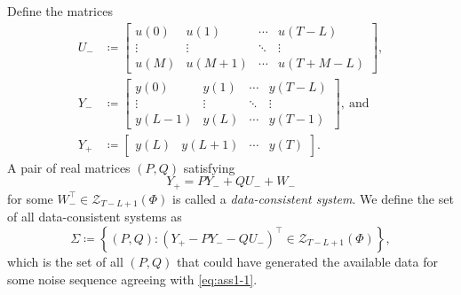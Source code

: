 \documentclass[pdflatex,sn-mathphys-num]{sn-jnl}%
\theoremstyle{thmstyleone}
\begin{document}
Define the matrices
\begin{equation*}
\begin{split}
U_-&\coloneqq \begin{bmatrix}
u(0) & u(1) & \cdots & u(T-L) \\ 
\vdots & \vdots & \ddots & \vdots \\
u(M) & u(M+1) & \cdots & u(T+M-L)
\end{bmatrix}, \\
Y_-&\coloneqq \begin{bmatrix}
y(0) & y(1) & \cdots & y(T-L) \\
\vdots & \vdots & \ddots & \vdots \\
y(L-1) & y(L) & \cdots & y(T-1)
\end{bmatrix},\ \text{and} \\
Y_+&\coloneqq \begin{bmatrix}
y(L) & y(L+1) & \cdots & y(T)\end{bmatrix}.
\end{split}
\end{equation*}
A pair of real matrices $(P,Q)$ satisfying
\begin{equation}
\label{eq:7}
Y_+=PY_-+QU_-+W_-
\end{equation}
for some $W_-^\top\in \mathcal{Z}_{T-L+1}(\Phi)$ is called a \emph{data-consistent system}. We define the set of all data-consistent systems as
\begin{equation}
\label{eq:8}
\Sigma\coloneqq \left\{(P,Q):(Y_+-PY_--QU_-)^\top\in \mathcal{Z}_{T-L+1}(\Phi)\right\},
\end{equation}
which is the set of all $(P,Q)$ that could have generated the available data for some noise sequence agreeing with \eqref{eq:ass1-1}. 
\end{document}
